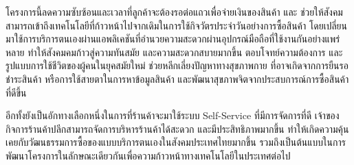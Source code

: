 \par โครงการนี้ลดความซับซ้อนและเวลาที่ลูกค้าจะต้องรอต่อแถวเพื่อจ่ายเงินของสินค้า
และ ช่วยให้สังคมสามารถเข้าถึงเทคโนโลยีที่ก้าวหน้าไปจากเดิมในการใช้กิจวัตรประจำวันอย่างการซื้อสินค้า
โดยเปลี่ยนมาใช้การบริการตนเองผ่านแอพลิเคชันที่อำนวยความสะดวกผ่านอุปกรณ์มือถือที่ใช้งานกันอย่างแพร่หลาย 
ทำให้สังคมคมก้าวสู่ความทันสมัย และความสะดวกสบายมากขึ้น ตอบโจทย์ความต้องการ และรูปแบบการใช้ชีวิตของผู้คนในยุคสมัยใหม่ 
ช่วยหลีกเลี่ยงปัญหาทางสุขภาพกาย ที่อาจเกิดจากการยืนรอชำระสินค้า หรือการใช้สายตาในการหาข้อมูลสินค้า 
และพัฒนาสุขภาพจิตจากประสบการณ์การซื้อสินค้าที่ดีขึ้น 
\par อีกทั้งยังเป็นอักทางเลือกหนึ่งในการที่ร้านค้าจะมาใช้ระบบ Self-Service ที่มีการจัดการที่ดี
เจ้าของกิจการร้านค้าปลีกสามารถจัดการบริหารร้านค้าได้สะดวก 
และมีประสิทธิภาพมากขึ้น ทำให้เกิดความคุ้นเคยกับวัฒนธรรมการซื้อของแบบบริการตนเองในสังคมประเทศไทยมากขึ้น 
รวมถึงเป็นต้นแบบในการพัฒนาโครงการในลักษณะเดียวกันเพื่อความก้าวหน้าทางเทคโนโลยีในประเทศต่อไป